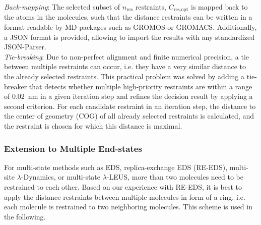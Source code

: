 \noindent \textit{Back-mapping}:
The selected subset of $n_\text{res}$ restraints, $C_\text{res,opt}$ is mapped back to the atoms in the molecules, such that the distance restraints can be written in a format readable by MD packages such as GROMOS\cite{Schmid2012} or GROMACS.\cite{Abraham2015} Additionally, a JSON\cite{Pezoa2016} format is provided, allowing to import the results with any standardized JSON-Parser. \\

\noindent \textit{Tie-breaking}:
Due to non-perfect alignment and finite numerical precision, a tie between multiple restraints can occur, i.e. they have a very similar distance to the already selected restraints. This practical problem was solved by adding a tie-breaker that detects whether multiple high-priority restraints are within a range of $0.02$~nm in a given iteration step and refines the decision result by applying a second criterion. 
For each candidate restraint in an iteration step, the distance to the center of geometry (COG) of all already selected restraints is calculated, and the restraint is chosen for which this distance is maximal.


\subsubsection{Extension to Multiple End-states}

For multi-state methods such as EDS\cite{Christ2007,Christ2008}, replica-exchange EDS (RE-EDS)\cite{Sidler2016,Sidler2017,Ries2021B}, multi-site $\lambda$-Dynamics,\cite{Knight2011} or multi-state $\lambda$-LEUS,\cite{Bieler2015} more than two molecules need to be restrained to each other. Based on our experience with RE-EDS, it is best to apply the distance restraints between multiple molecules in form of a ring, i.e. each molecule is restrained to two neighboring molecules.\cite{Ries2021B} This scheme is used in the following.

